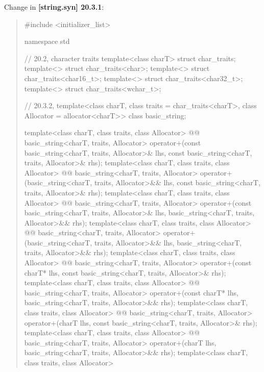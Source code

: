 \documentclass{wg21}
\begin{document}
Change in \textbf{[string.syn] 20.3.1}:
\begin{quote}
\begin{codeblock}
#include <initializer_list>

namespace std {
  // 20.2, character traits
  template<class charT> struct char_traits;
  template<> struct char_traits<char>;
  template<> struct char_traits<char16_t>;
  template<> struct char_traits<char32_t>;
  template<> struct char_traits<wchar_t>;

  // 20.3.2, 
  template<class charT, class traits = char_traits<charT>, class Allocator = allocator<charT>>
    class basic_string;

  template<class charT, class traits, class Allocator>
    @@ basic_string<charT, traits, Allocator>
      operator+(const basic_string<charT, traits, Allocator>& lhs,
                const basic_string<charT, traits, Allocator>& rhs);
  template<class charT, class traits, class Allocator>
    @@ basic_string<charT, traits, Allocator>
      operator+(basic_string<charT, traits, Allocator>&& lhs,
                const basic_string<charT, traits, Allocator>& rhs);
  template<class charT, class traits, class Allocator>
    @@ basic_string<charT, traits, Allocator>
      operator+(const basic_string<charT, traits, Allocator>& lhs,
                basic_string<charT, traits, Allocator>&& rhs);
  template<class charT, class traits, class Allocator>
    @@ basic_string<charT, traits, Allocator>
      operator+(basic_string<charT, traits, Allocator>&& lhs,
                basic_string<charT, traits, Allocator>&& rhs);
  template<class charT, class traits, class Allocator>
    @@ basic_string<charT, traits, Allocator>
      operator+(const charT* lhs,
                const basic_string<charT, traits, Allocator>& rhs);
  template<class charT, class traits, class Allocator>
    @@ basic_string<charT, traits, Allocator>
      operator+(const charT* lhs,
                basic_string<charT, traits, Allocator>&& rhs);
  template<class charT, class traits, class Allocator>
    @@ basic_string<charT, traits, Allocator>
      operator+(charT lhs,
                const basic_string<charT, traits, Allocator>& rhs);
  template<class charT, class traits, class Allocator>
    @@ basic_string<charT, traits, Allocator>
      operator+(charT lhs,
                basic_string<charT, traits, Allocator>&& rhs);
  template<class charT, class traits, class Allocator>
}
\end{codeblock}
\end{quote}
\end{document}
